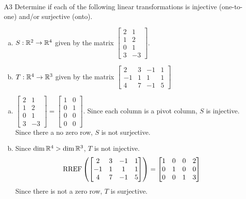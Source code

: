 \documentclass{sbgLAquiz}
\begin{document}
\begin{problem}{A3}
Determine if each of the following linear transformations is injective (one-to-one) and/or surjective (onto).
\begin{enumerate}[(a)]
\item $S: \mathbb{R}^2 \rightarrow \mathbb{R}^4$ given by the matrix $\begin{bmatrix} 2 & 1 \\ 1 & 2 \\ 0 & 1 \\ 3 & -3 \end{bmatrix}$.
\item $T: \mathbb{R}^4 \rightarrow \mathbb{R}^3$ given by the matrix $\begin{bmatrix} 2 & 3 & -1 & 1 \\ -1 & 1 & 1 & 1 \\ 4 & 7 & -1 & 5 \end{bmatrix}$
\end{enumerate}
\end{problem}
\begin{solution}
\begin{enumerate}[(a)]
\item $ \begin{bmatrix} 2 & 1 \\ 1 & 2 \\ 0 & 1 \\ 3 & -3 \end{bmatrix}=\begin{bmatrix}1 & 0 \\ 0 & 1 \\ 0 & 0 \\ 0 & 0  \end{bmatrix}$.  Since each column is a pivot column, $S$ is injective.  Since there a no zero row, $S$ is not surjective. 
\item Since $\dim \mathbb{R}^4 > \dim \mathbb{R}^3$, $T$ is not injective.
$$\operatorname{RREF}\left(\begin{bmatrix} 2 & 3 & -1 & 1 \\ -1 & 1 & 1 & 1 \\ 4 & 7 & -1 & 5 \end{bmatrix}\right) = \begin{bmatrix} 1 & 0  & 0 & 2 \\ 0 & 1 & 0 & 0  \\ 0 & 0 & 1 & 3 \end{bmatrix}$$
Since there is not a zero row, $T$ is surjective.
\end{enumerate}
\end{solution}
\end{document}
